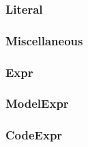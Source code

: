 \subsubsection{Literal}



\subsubsection{Miscellaneous}



\subsubsection{Expr}



\subsubsection{ModelExpr}



\subsubsection{CodeExpr}


